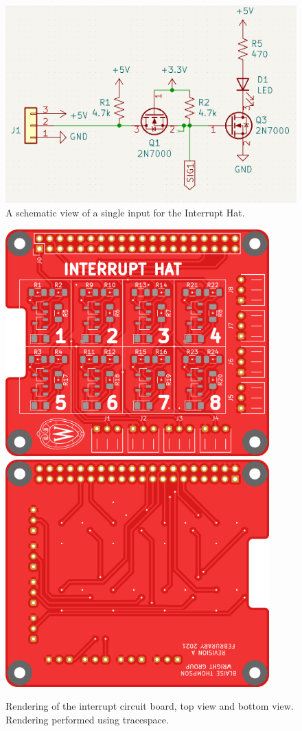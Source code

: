 \begin{figure}
	\includegraphics[width=5in]{opa400/images/interrupt_schematic}
\caption[Interrupt Hat Schematic]{
	A schematic view of a single input for the Interrupt Hat.
}
\label{opa4:fig:interrupt_schematic}
\end{figure}


\begin{figure}
	\includegraphics[width=4in]{opa400/images/interrupt_top}
	\includegraphics[width=4in]{opa400/images/interrupt_bottom}
\caption[Interrupt Hat Circuit Board]{
Rendering of the interrupt circuit board, top view and bottom view.
Rendering performed using tracespace\cite{tracespace}.
}
\label{opa4:fig:interrupt_board}
\end{figure}

